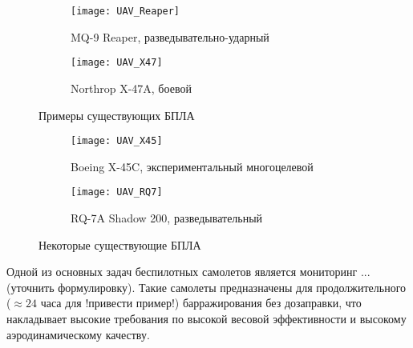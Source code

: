 \begin{figure}[H]
        \begin{subfigure}[b]{0.47\textwidth}
                \texttt{[image: UAV\_Reaper]}
                \caption{MQ-9 Reaper, разведывательно-ударный} %
                \label{fig:UAV_Reaper}
        \end{subfigure}%
        \hspace{\fill}
        \begin{subfigure}[b]{0.47\textwidth}
                \texttt{[image: UAV\_X47]}
                \caption{Northrop X-47A, боевой} %
                \label{fig:UAV_X47}
        \end{subfigure}%
        \caption{Примеры существующих БПЛА}\label{fig:UAVs}
\end{figure}

\begin{figure}
        \begin{subfigure}[b]{0.47\textwidth}
                \texttt{[image: UAV\_X45]}
                \caption{Boeing X-45C, экспериментальный многоцелевой}
                \label{fig:UAV_X45}
        \end{subfigure}%
        \hspace{\fill}
        \begin{subfigure}[b]{0.47\textwidth}
                \texttt{[image: UAV\_RQ7]}
                \caption{RQ-7A Shadow 200, разведывательный}
                \label{fig:UAV_RQ7}
        \end{subfigure}
        \caption{Некоторые существующие БПЛА}\label{fig:UAVs}
\end{figure}



Одной из основных задач беспилотных самолетов является мониторинг ... (уточнить формулировку). Такие самолеты предназначены для продолжительного ($\approx24$ часа для !привести пример!) барражирования без дозаправки, что накладывает высокие требования по высокой весовой эффективности и высокому аэродинамическому качеству.

